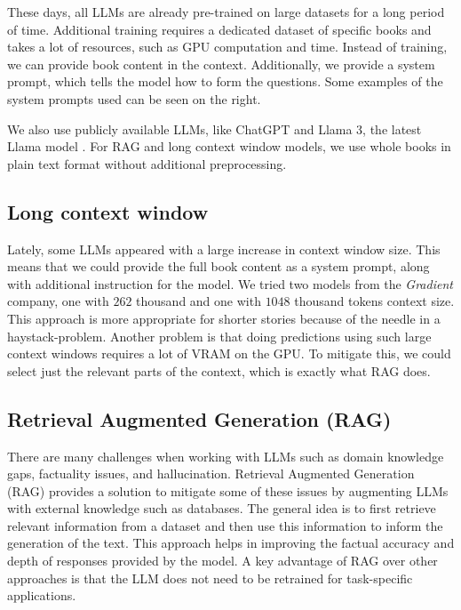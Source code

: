 \documentclass[fleqn,moreauthors,10pt]{ds_report}
\begin{document}
These days, all LLMs are already pre-trained on large datasets for a long period of time.
Additional training requires a dedicated dataset of specific books and takes a lot of resources,
such as GPU computation and time. Instead of training, we can provide book content in
the context. Additionally, we provide a system prompt, which tells the model how to
form the questions. Some examples of the system prompts used can be seen on the right.

We also use publicly available LLMs, like ChatGPT and Llama 3, the latest Llama model 
\cite{llama}. For RAG and long context window models, we use whole books in plain text format without
additional preprocessing.

\subsection*{Long context window}
Lately, some LLMs appeared with a large increase in context window size. This means
that we could provide the full book content as a system prompt, along with additional
instruction for the model. We tried two models from the \emph{Gradient} company, one
with $262$ thousand and one with $1048$ thousand tokens context size. This approach
is more appropriate for shorter stories because of the needle in a haystack-problem.
Another problem is that doing predictions using such large context windows requires
a lot of VRAM on the GPU. To mitigate this, we could select just the relevant parts of
the context, which is exactly what RAG does.

\subsection*{Retrieval Augmented Generation (RAG)}
There are many challenges when working with LLMs such as domain knowledge gaps, factuality issues, and hallucination. Retrieval Augmented Generation (RAG) \cite{rag} provides a solution to mitigate some of these issues by augmenting LLMs with external knowledge such as databases. The general idea is to first retrieve relevant information from a dataset and then use this information to inform the generation of the text. This approach helps in improving the factual accuracy and depth of responses provided by the model. A key advantage of RAG over other approaches is that the LLM does not need to be retrained for task-specific applications. 
\end{document}
